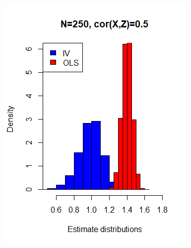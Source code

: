\documentclass[a4paper,12pt,oneside,English]{article}
\begin{document}
\begin{figure}[p!]
\begin{minipage}[b]{0.5\linewidth}
        \includegraphics[width=\linewidth]{Fig3.png}
    \end{minipage}
    \begin{minipage}[b]{0.5\linewidth}

\end{minipage}
\end{figure}
\end{document}
